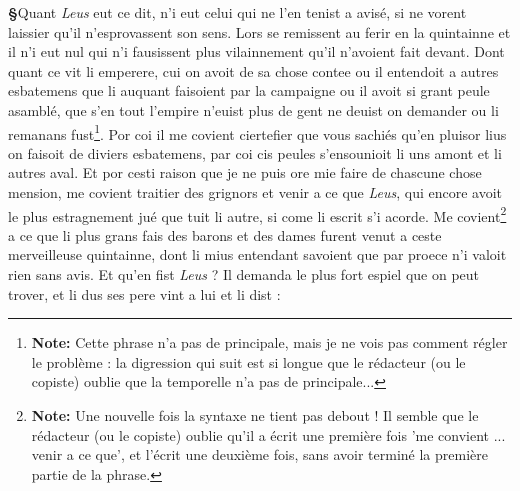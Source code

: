 \documentclass[12pt]{article} %
\newcommand{\persName}[1]{\emph{#1}} %
\newcommand{\fnnote}[1]{\footnote{\textbf{Note:} #1}} %
\newcounter{paranum}
\newcommand{\pnum}{\stepcounter{paranum}\textbf{§\arabic{paranum}}\quad}
\begin{document}
\pnum Quant \persName{Leus} eut ce dit, n'i eut celui qui ne l'en tenist a avisé, si ne vorent laissier qu'il n'esprovassent son sens. Lors se remissent au ferir en la quintainne et il n'i eut nul qui n'i fausissent plus vilainnement qu'il n'avoient fait devant. Dont quant ce vit li emperere, cui on avoit de sa chose contee ou il entendoit a autres esbatemens que li auquant faisoient par la campaigne ou il avoit si grant peule asamblé, que s'en tout l'empire n'euist plus de gent ne deuist on demander ou li remanans fust\fnnote{Cette phrase n'a pas de principale, mais je ne vois pas comment régler le problème : la digression qui suit est si longue que le rédacteur (ou le copiste) oublie que la temporelle n'a pas de principale...}. Por coi il me covient ciertefier que vous sachiés qu'en pluisor lius on faisoit de diviers esbatemens, par coi cis peules s'ensounioit li uns amont et li autres aval. Et por cesti raison que je ne puis ore mie faire de chascune chose mension, me covient traitier des grignors et venir a ce que \persName{Leus}, qui encore avoit le plus estragnement jué que tuit li autre, si come li escrit s'i acorde. Me covient\fnnote{Une nouvelle fois la syntaxe ne tient pas debout ! Il semble que le rédacteur (ou le copiste) oublie qu'il a écrit une première fois 'me convient ... venir a ce que', et l'écrit une deuxième fois, sans avoir terminé la première partie de la phrase.} a ce que li plus grans fais des barons et des dames furent venut a ceste merveilleuse quintainne, dont li mius entendant savoient que par proece n'i valoit rien sans avis. Et qu'en fist \persName{Leus} ? Il demanda le plus fort espiel que on peut trover, et li dus ses pere vint a lui et li dist :
\end{document}
